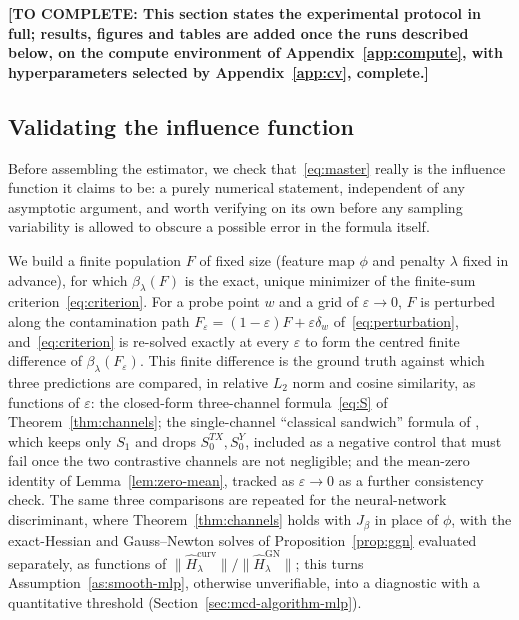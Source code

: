 \documentclass[11pt]{article}
\newcommand{\TODO}[1]{\textbf{[TO COMPLETE: #1]}}
\theoremstyle{plain}
\theoremstyle{definition}
\theoremstyle{remark}
\newcommand{\score}{S}
\begin{document}
\TODO{This section states the experimental protocol in full; results, figures and tables are
added once the runs described below, on the compute environment of
Appendix~\ref{app:compute}, with hyperparameters selected by Appendix~\ref{app:cv}, complete.}

\subsection{Validating the influence function}
\label{sec:sim-if}

Before assembling the estimator, we check that~\eqref{eq:master} really is the influence
function it claims to be: a purely numerical statement, independent of any asymptotic argument,
and worth verifying on its own before any sampling variability is allowed to obscure a possible
error in the formula itself.

We build a finite population $F$ of fixed size (feature map $\phi$ and penalty $\lambda$ fixed
in advance), for which $\beta_\lambda(F)$ is the exact, unique minimizer of the finite-sum
criterion~\eqref{eq:criterion}. For a probe point $w$ and a grid of $\varepsilon \to 0$, $F$ is
perturbed along the contamination path $F_\varepsilon = (1-\varepsilon)F + \varepsilon\delta_w$
of~\eqref{eq:perturbation}, and~\eqref{eq:criterion} is re-solved exactly at every
$\varepsilon$ to form the centred finite difference of $\beta_\lambda(F_\varepsilon)$. This
finite difference is the ground truth against which three predictions are compared, in relative
$L_2$ norm and cosine similarity, as functions of $\varepsilon$: the closed-form three-channel
formula~\eqref{eq:S} of Theorem~\ref{thm:channels}; the single-channel ``classical sandwich''
formula of \citet{avella2017,kohliang2017}, which keeps only $\score_1$ and drops
$\score_0^{TX},\score_0^{Y}$, included as a negative control that must fail once the two
contrastive channels are not negligible; and the mean-zero identity of Lemma~\ref{lem:zero-mean},
tracked as $\varepsilon \to 0$ as a further consistency check. The same three comparisons are
repeated for the neural-network discriminant, where Theorem~\ref{thm:channels} holds with
$J_\beta$ in place of $\phi$, with the
exact-Hessian and Gauss--Newton solves of Proposition~\ref{prop:ggn} evaluated separately, as
functions of $\|\widehat H_\lambda^{\mathrm{curv}}\|/\|\widehat H_\lambda^{\mathrm{GN}}\|$; this
turns Assumption~\ref{as:smooth-mlp}, otherwise unverifiable, into a diagnostic with a
quantitative threshold (Section~\ref{sec:mcd-algorithm-mlp}).
\end{document}
